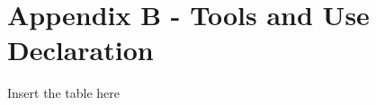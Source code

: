 \cleardoublepage%
\chapter*{\label{chap:apx_b}Appendix B - Tools and Use Declaration}%
%

Insert the table here